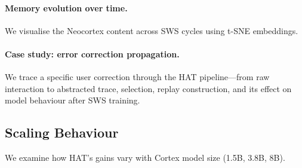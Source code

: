 \paragraph{Memory evolution over time.}
We visualise the Neocortex content across SWS cycles using t-SNE embeddings.

\paragraph{Case study: error correction propagation.}
We trace a specific user correction through the HAT pipeline—from raw interaction to abstracted trace, selection, replay construction, and its effect on model behaviour after SWS training.

\subsection{Scaling Behaviour}
\label{sec:analysis:scaling}

We examine how HAT's gains vary with Cortex model size (1.5B, 3.8B, 8B).
